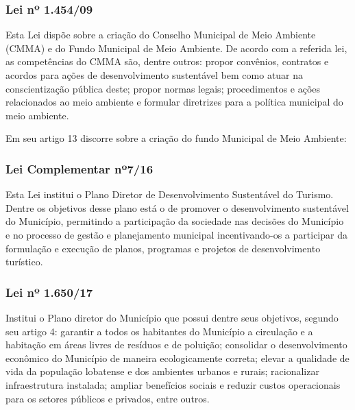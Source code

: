 	\subsubsection{Lei nº 1.454/09}

	Esta Lei dispõe sobre a criação do Conselho Municipal de Meio Ambiente (CMMA) e do Fundo Municipal de Meio Ambiente. De acordo com a referida lei, as competências do CMMA são, dentre outros: propor convênios, contratos e acordos para ações de desenvolvimento sustentável bem como atuar na conscientização pública deste; propor normas legais; procedimentos e ações relacionados ao meio ambiente e formular diretrizes para a política municipal do meio ambiente. 
	
	Em seu artigo 13 discorre sobre a criação do fundo Municipal de Meio Ambiente:
	
	
	\subsubsection{Lei Complementar nº7/16}
	
	Esta Lei institui o Plano Diretor de Desenvolvimento Sustentável do Turismo. Dentre os objetivos desse plano está o de promover o desenvolvimento sustentável do Município, permitindo a participação da sociedade nas decisões do Município e no processo de gestão e planejamento municipal incentivando-os a participar da formulação e execução de planos, programas e projetos de desenvolvimento turístico.
	
	\subsubsection{Lei nº 1.650/17}
	
	Institui o Plano diretor do Município que possui dentre seus objetivos, segundo seu artigo 4: garantir a todos os habitantes do Município a circulação e a habitação em áreas livres de resíduos e de poluição; consolidar o desenvolvimento econômico do Município de maneira ecologicamente correta; elevar a qualidade de vida da população lobatense e dos ambientes urbanos e rurais; racionalizar infraestrutura instalada; ampliar benefícios sociais e reduzir custos operacionais para os setores públicos e privados, entre outros.	
	

